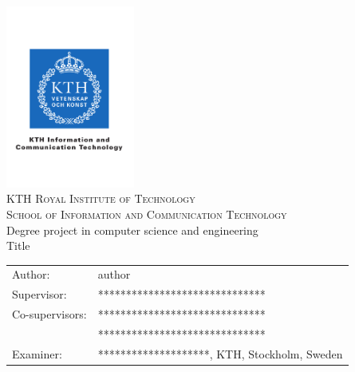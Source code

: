 \documentclass[11pt,a4paper,abstractoff,titlepage,final,parskip=half*,BCOR10mm,appendixprefix=true]{scrreprt}%
\begin{document}

\begin{titlepage}
\thispagestyle{empty}
\begin{center}
  \includegraphics[height=6cm]{kth_cmyk_info_comm_tech}\\
  \vspace{.5cm}
  \huge{\normalfont \scshape KTH Royal Institute of Technology}\\
  \vspace{.5cm}
  \Large{\normalfont \scshape School of Information and Communication Technology}\\
  \vspace{3.5cm}
  \normalsize Degree project in computer science and engineering\\
  \vspace{2mm}
  \Large{Title}
  \vspace{2cm}
\end{center}
\begin{tabular}{ll}
\noindent Author: & author \\ [6ex]
\noindent Supervisor: & ******************************\\ [1ex]
\noindent Co-supervisors: & ****************************** \\
                          & ****************************** \\[1ex]
\noindent Examiner:  &********************, KTH, Stockholm, Sweden\\

\end{tabular}
\end{titlepage}
\newpage





\begin{abstract}

\subsubsection*{\centering\abstractname}




\end{abstract}
\end{document}
